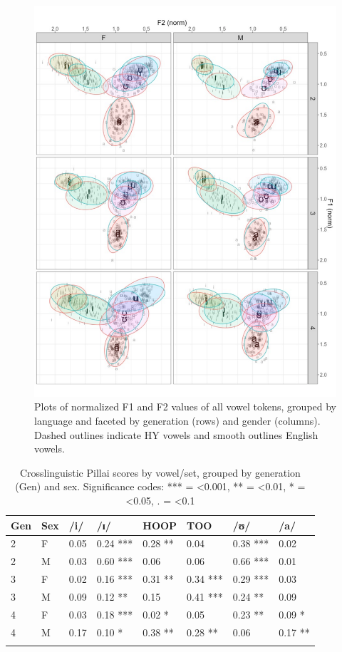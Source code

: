 \documentclass[output=paper]{langsci/langscibook}
\begin{document}
\begin{figure}
\includegraphics[width=\textwidth]{figures/nove-fig7-color.pdf}
\caption{Plots of normalized F1 and F2 values of all vowel tokens, grouped by language and faceted by generation (rows) and gender (columns). Dashed outlines indicate HY vowels and smooth outlines English vowels.}\label{fig:nove:7}
\end{figure}

\begin{table}
\begin{tabularx}{\textwidth}{XXXXXXXX}
\lsptoprule
Gen & Sex & /i/ & /ɪ/ & HOOP  & TOO  & /ʊ/  & /a/ \\
\hline
2 & F & 0.05 & 0.24 *** & 0.28 ** & 0.04 & 0.38 *** & 0.02 \\
2 & M & 0.03 & 0.60 *** & 0.06 & 0.06 & 0.66 *** & 0.01  \\
3 & F & 0.02 & 0.16 *** & 0.31 ** & 0.34 *** & 0.29 *** & 0.03 \\
3 & M & 0.09 & 0.12 ** & 0.15 & 0.41 *** & 0.24 ** & 0.09  \\
4 & F & 0.03 & 0.18 *** & 0.02 * & 0.05 & 0.23 ** & 0.09 *\\
4 & M & 0.17 & 0.10 * & 0.38 ** & 0.28 ** & 0.06 & 0.17 **\\
\lspbottomrule
\end{tabularx}
\caption{Crosslinguistic Pillai scores by vowel/set, grouped by generation (Gen) and sex. Significance codes: *** = <0.001, ** = <0.01, * = <0.05, . = <0.1}
\label{tab:nove:3}
\end{table}
\end{document}
